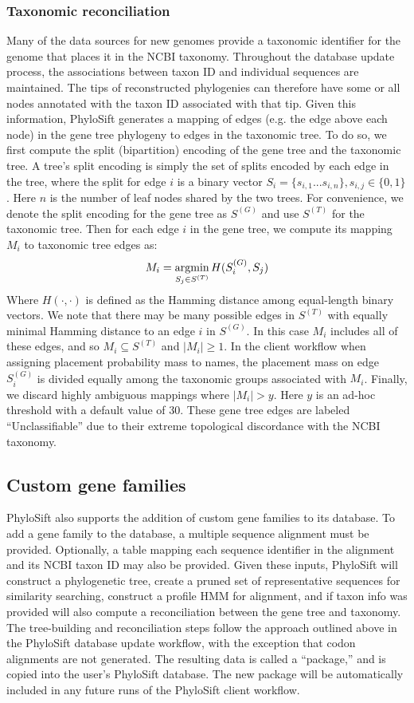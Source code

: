 \documentclass[10pt]{article}
\newcommand{\argmin}{\operatornamewithlimits{argmin}}
\begin{document}
\subsubsection*{Taxonomic reconciliation}
Many of the data sources for new genomes provide a taxonomic identifier for the genome that places it in the NCBI taxonomy.
Throughout the database update process, the associations between taxon ID and individual sequences are maintained.
The tips of reconstructed phylogenies can therefore have some or all nodes annotated with the taxon ID associated with that tip.
Given this information, PhyloSift generates a mapping of edges (e.g. the edge above each node) in the gene tree phylogeny to edges in the taxonomic tree.
To do so, we first compute the split (bipartition) encoding of the gene tree and the taxonomic tree.
A tree's split encoding is simply the set of splits encoded by each edge in the tree, where the split for edge $i$ is a binary vector $S_i = \{s_{i,1}...s_{i,n}\}, s_{i,j} \in \{0,1\}$.
Here $n$ is the number of leaf nodes shared by the two trees.
For convenience, we denote the split encoding for the gene tree as $S^{(G)}$ and use $S^{(T)}$ for the taxonomic tree.
Then for each edge $i$ in the gene tree, we compute its mapping $M_i$ to taxonomic tree edges as:
$$
M_i = \argmin_{S_j \in S^{(T)}} H(S^{(G)}_i, S_j)
$$
Where $H(\cdot,\cdot)$ is defined as the Hamming distance among equal-length binary vectors.
We note that there may be many possible edges in $S^{(T)}$ with equally minimal Hamming distance to an edge $i$ in $S^{(G)}$.
In this case $M_i$ includes all of these edges, and so $M_i \subseteq S^{(T)}$ and $|M_i| \geq 1$.
In the client workflow when assigning placement probability mass to names, the placement mass on edge $S^{(G)}_i$ is divided equally among the taxonomic groups associated with $M_i$.
Finally, we discard highly ambiguous mappings where $|M_i|>y$. 
Here $y$ is an ad-hoc threshold with a default value of 30.
These gene tree edges are labeled ``Unclassifiable'' due to their extreme topological discordance with the NCBI taxonomy.

\subsection*{Custom gene families}

PhyloSift also supports the addition of custom gene families to its database.
To add a gene family to the database, a multiple sequence alignment must be provided.
Optionally, a table mapping each sequence identifier in the alignment and its NCBI taxon ID may also be provided.
Given these inputs, PhyloSift will construct a phylogenetic tree, create a pruned set of representative sequences for similarity searching, construct a profile HMM for alignment, and if taxon info was provided will also compute a reconciliation between the gene tree and taxonomy.
The tree-building and reconciliation steps follow the approach outlined above in the PhyloSift database update workflow, with the exception that codon alignments are not generated.
The resulting data is called a ``package,'' and is copied into the user's PhyloSift database.
The new package will be automatically included in any future runs of the PhyloSift client workflow.
\end{document}
